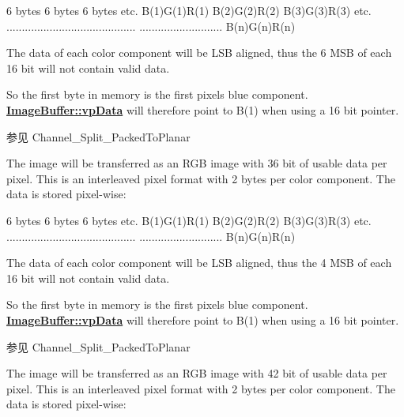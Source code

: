 \begin{Desc}
\begin{description}
\begin{DoxyCode}
6 bytes        6 bytes        6 bytes      etc.
B(1)G(1)R(1)   B(2)G(2)R(2)   B(3)G(3)R(3) etc.
..........................................
...........................   B(n)G(n)R(n)
\end{DoxyCode}


The data of each color component will be L\+S\+B aligned, thus the 6 M\+S\+B of each 16 bit will not contain valid data.

So the first byte in memory is the first pixels blue component. {\bfseries \hyperlink{struct_image_buffer_ab67c9c21d749e786302c848b508e0673}{Image\+Buffer\+::vp\+Data}} will therefore point to B(1) when using a 16 bit pointer.

\begin{DoxySeeAlso}{参见}
Channel\+\_\+\+Split\+\_\+\+Packed\+To\+Planar 
\end{DoxySeeAlso}
\item[{\em 
\hypertarget{group___common_interface_gga02e0fc32ff10e0bc0f2e8b9c321d65c9adf93c5fa16aa2ef524bf4ead44b9d544}{idpf\+R\+G\+B121212\+Packed}\label{group___common_interface_gga02e0fc32ff10e0bc0f2e8b9c321d65c9adf93c5fa16aa2ef524bf4ead44b9d544}
}]The image will be transferred as an R\+G\+B image with 36 bit of usable data per pixel. This is an interleaved pixel format with 2 bytes per color component. The data is stored pixel-\/wise\+:


\begin{DoxyCode}
6 bytes        6 bytes        6 bytes      etc.
B(1)G(1)R(1)   B(2)G(2)R(2)   B(3)G(3)R(3) etc.
..........................................
...........................   B(n)G(n)R(n)
\end{DoxyCode}


The data of each color component will be L\+S\+B aligned, thus the 4 M\+S\+B of each 16 bit will not contain valid data.

So the first byte in memory is the first pixels blue component. {\bfseries \hyperlink{struct_image_buffer_ab67c9c21d749e786302c848b508e0673}{Image\+Buffer\+::vp\+Data}} will therefore point to B(1) when using a 16 bit pointer.

\begin{DoxySeeAlso}{参见}
Channel\+\_\+\+Split\+\_\+\+Packed\+To\+Planar 
\end{DoxySeeAlso}
\item[{\em 
\hypertarget{group___common_interface_gga02e0fc32ff10e0bc0f2e8b9c321d65c9a3bfb0d7086ff8bae8959eb57ec0452ca}{idpf\+R\+G\+B141414\+Packed}\label{group___common_interface_gga02e0fc32ff10e0bc0f2e8b9c321d65c9a3bfb0d7086ff8bae8959eb57ec0452ca}
}]The image will be transferred as an R\+G\+B image with 42 bit of usable data per pixel. This is an interleaved pixel format with 2 bytes per color component. The data is stored pixel-\/wise\+:



\end{description}
\end{Desc}

